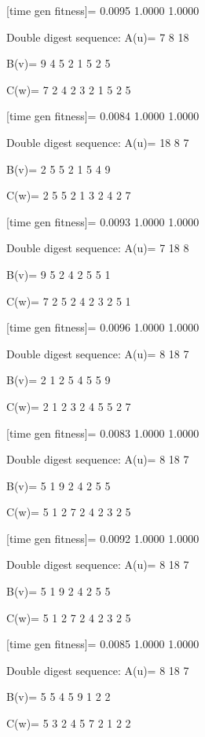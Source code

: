 [time gen fitness]=
    0.0095    1.0000    1.0000

Double digest sequence:
A(u)=
     7     8    18

B(v)=
     9     4     5     2     1     5     2     5

C(w)=
     7     2     4     2     3     2     1     5     2     5

[time gen fitness]=
    0.0084    1.0000    1.0000

Double digest sequence:
A(u)=
    18     8     7

B(v)=
     2     5     5     2     1     5     4     9

C(w)=
     2     5     5     2     1     3     2     4     2     7

[time gen fitness]=
    0.0093    1.0000    1.0000

Double digest sequence:
A(u)=
     7    18     8

B(v)=
     9     5     2     4     2     5     5     1

C(w)=
     7     2     5     2     4     2     3     2     5     1

[time gen fitness]=
    0.0096    1.0000    1.0000

Double digest sequence:
A(u)=
     8    18     7

B(v)=
     2     1     2     5     4     5     5     9

C(w)=
     2     1     2     3     2     4     5     5     2     7

[time gen fitness]=
    0.0083    1.0000    1.0000

Double digest sequence:
A(u)=
     8    18     7

B(v)=
     5     1     9     2     4     2     5     5

C(w)=
     5     1     2     7     2     4     2     3     2     5

[time gen fitness]=
    0.0092    1.0000    1.0000

Double digest sequence:
A(u)=
     8    18     7

B(v)=
     5     1     9     2     4     2     5     5

C(w)=
     5     1     2     7     2     4     2     3     2     5

[time gen fitness]=
    0.0085    1.0000    1.0000

Double digest sequence:
A(u)=
     8    18     7

B(v)=
     5     5     4     5     9     1     2     2

C(w)=
     5     3     2     4     5     7     2     1     2     2

